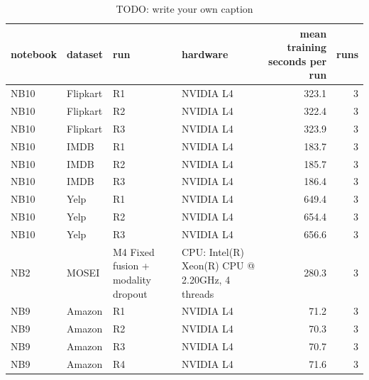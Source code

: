 \begin{table}[h]
\caption{TODO: write your own caption}\label{tab:T18-training-time}
\scriptsize
\begin{tabularx}{\textwidth}{ll>{\raggedright\arraybackslash}X>{\raggedright\arraybackslash}Xrr}
\toprule
notebook & dataset & run & hardware & mean training seconds per run & runs \\
\midrule
NB10 & Flipkart & R1 & NVIDIA L4 & 323.1 & 3 \\
NB10 & Flipkart & R2 & NVIDIA L4 & 322.4 & 3 \\
NB10 & Flipkart & R3 & NVIDIA L4 & 323.9 & 3 \\
NB10 & IMDB & R1 & NVIDIA L4 & 183.7 & 3 \\
NB10 & IMDB & R2 & NVIDIA L4 & 185.7 & 3 \\
NB10 & IMDB & R3 & NVIDIA L4 & 186.4 & 3 \\
NB10 & Yelp & R1 & NVIDIA L4 & 649.4 & 3 \\
NB10 & Yelp & R2 & NVIDIA L4 & 654.4 & 3 \\
NB10 & Yelp & R3 & NVIDIA L4 & 656.6 & 3 \\
NB2 & MOSEI & M4 Fixed fusion + modality dropout & CPU: Intel(R) Xeon(R) CPU @ 2.20GHz, 4 threads & 280.3 & 3 \\
NB9 & Amazon & R1 & NVIDIA L4 & 71.2 & 3 \\
NB9 & Amazon & R2 & NVIDIA L4 & 70.3 & 3 \\
NB9 & Amazon & R3 & NVIDIA L4 & 70.7 & 3 \\
NB9 & Amazon & R4 & NVIDIA L4 & 71.6 & 3 \\
\bottomrule
\end{tabularx}
\end{table}

